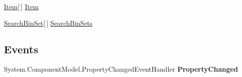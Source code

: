 \begin{DoxyCompactItemize}
\begin{DoxyCompactList}\small\item\em \end{DoxyCompactList}\item 
\hypertarget{class_price___comparison_1_1amazon_1_1ecs_1_1_items_ac2fabb738e4b11f075b1594049a75db4}{\hyperlink{class_price___comparison_1_1amazon_1_1ecs_1_1_item}{Item}\mbox{[}$\,$\mbox{]} \hyperlink{class_price___comparison_1_1amazon_1_1ecs_1_1_items_ac2fabb738e4b11f075b1594049a75db4}{Item}}\label{class_price___comparison_1_1amazon_1_1ecs_1_1_items_ac2fabb738e4b11f075b1594049a75db4}

\begin{DoxyCompactList}\small\item\em \end{DoxyCompactList}\item 
\hypertarget{class_price___comparison_1_1amazon_1_1ecs_1_1_items_ac259184f5653b41c4a6f78a5e88faffa}{\hyperlink{class_price___comparison_1_1amazon_1_1ecs_1_1_search_bin_set}{Search\-Bin\-Set}\mbox{[}$\,$\mbox{]} \hyperlink{class_price___comparison_1_1amazon_1_1ecs_1_1_items_ac259184f5653b41c4a6f78a5e88faffa}{Search\-Bin\-Sets}}\label{class_price___comparison_1_1amazon_1_1ecs_1_1_items_ac259184f5653b41c4a6f78a5e88faffa}

\begin{DoxyCompactList}\small\item\em \end{DoxyCompactList}\end{DoxyCompactItemize}
\subsection*{Events}
\begin{DoxyCompactItemize}
\item 
\hypertarget{class_price___comparison_1_1amazon_1_1ecs_1_1_items_a2d7d665433d7e347f677eb35257d49fa}{System.\-Component\-Model.\-Property\-Changed\-Event\-Handler {\bfseries Property\-Changed}}\label{class_price___comparison_1_1amazon_1_1ecs_1_1_items_a2d7d665433d7e347f677eb35257d49fa}

\end{DoxyCompactItemize}
